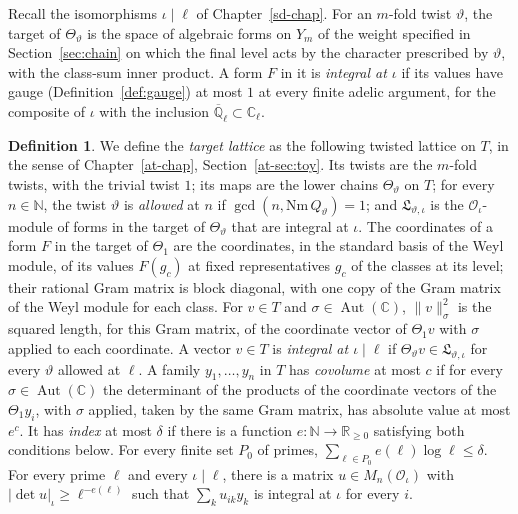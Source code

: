 \documentclass[reqno]{amsart}
\newcounter{chap}
\theoremstyle{plain}
\theoremstyle{definition}
\newtheorem{definition}[theorem]{Definition}
\newcommand{\Q}{{\mathbb{Q}}}
\newcommand{\C}{{\mathbb{C}}}
\newcommand{\R}{{\mathbb{R}}}
\newcommand{\Aut}{\operatorname{Aut}}
\newcommand{\Oc}{\mathcal O}
\begin{document}
Recall the isomorphisms \(\iota \mid \ell\) of Chapter~\ref{sd-chap}.  For an \(m\)-fold twist \(\vartheta\), the target of \(\Theta_\vartheta\) is the space of algebraic forms on \(Y_m\) of the weight specified in Section~\ref{sec:chain} on which the final level acts by the character prescribed by \(\vartheta\), with the class-sum inner product.  A form \(F\) in it is \emph{integral at \(\iota\)} if its values have gauge (Definition~\ref{def:gauge}) at most \(1\) at every finite adelic argument, for the composite of \(\iota\) with the inclusion \(\overline{\Q}_\ell \subset \C_\ell\).

\begin{definition}\label{def:target-lattice}
We define the \emph{target lattice} as the following twisted lattice on \(T\), in the sense of Chapter~\ref{at-chap}, Section~\ref{at-sec:toy}.  Its twists are the \(m\)-fold twists, with the trivial twist \(1\); its maps are the lower chains \(\Theta_\vartheta\) on \(T\); for every \(n \in \mathbb N\), the twist \(\vartheta\) is \emph{allowed} at \(n\) if \(\gcd(n, \mathrm{Nm}\,Q_\vartheta) = 1\); and \(\mathfrak L_{\vartheta,\iota}\) is the \(\Oc_\iota\)-module of forms in the target of \(\Theta_\vartheta\) that are integral at \(\iota\).  The coordinates of a form \(F\) in the target of \(\Theta_1\) are the coordinates, in the standard basis of the Weyl module, of its values \(F(g_c)\) at fixed representatives \(g_c\) of the classes at its level; their rational Gram matrix is block diagonal, with one copy of the Gram matrix of the Weyl module for each class.  For \(v \in T\) and \(\sigma \in \Aut(\C)\), \(\lVert v \rVert_\sigma^2\) is the squared length, for this Gram matrix, of the coordinate vector of \(\Theta_1 v\) with \(\sigma\) applied to each coordinate.  A vector \(v \in T\) is \emph{integral at \(\iota \mid \ell\)} if \(\Theta_\vartheta v \in \mathfrak L_{\vartheta,\iota}\) for every \(\vartheta\) allowed at \(\ell\).  A family \(y_1, \dots, y_n\) in \(T\) has \emph{covolume} at most \(c\) if for every \(\sigma \in \Aut(\C)\) the determinant of the products of the coordinate vectors of the \(\Theta_1 y_i\), with \(\sigma\) applied, taken by the same Gram matrix, has absolute value at most \(e^c\).  It has \emph{index} at most \(\delta\) if there is a function \(e \colon \mathbb N \to \R_{\ge 0}\) satisfying both conditions below.  For every finite set \(P_0\) of primes, \(\sum_{\ell \in P_0} e(\ell) \log \ell \le \delta\).  For every prime \(\ell\) and every \(\iota \mid \ell\), there is a matrix \(u \in M_n(\Oc_\iota)\) with \(\lvert \det u \rvert_\iota \ge \ell^{-e(\ell)}\) such that \(\sum_k u_{ik} y_k\) is integral at \(\iota\) for every \(i\).
\end{definition}
\end{document}
